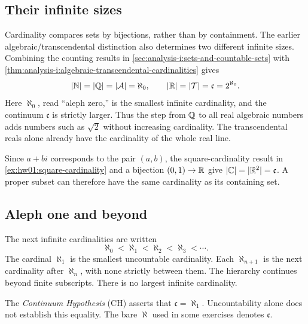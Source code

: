 \subsection{Their infinite sizes}
Cardinality compares sets by bijections, rather than by containment.
The earlier algebraic/transcendental distinction also determines two
different infinite sizes. Combining the counting results in
\autoref{sec:analysis-i:sets-and-countable-sets} with
\autoref{thm:analysis-i:algebraic-transcendental-cardinalities} gives
\[
  |\mathbb{N}|=|\mathbb{Q}|=|\mathcal A|=\aleph_0,
  \qquad
  |\mathbb{R}|=|\mathcal T|=\mathfrak c=2^{\aleph_0}.
\]
Here $\aleph_0$, read ``aleph zero,'' is the smallest infinite
cardinality, and the continuum $\mathfrak c$ is strictly larger.
Thus the step from $\mathbb{Q}$ to all real algebraic numbers adds numbers
such as $\sqrt2$ without increasing cardinality. The transcendental
reals alone already have the cardinality of the whole real line.

Since $a+bi$ corresponds to the pair $(a,b)$, the square-cardinality
result in \autoref{ex:hw01:square-cardinality} and a bijection
$(0,1)\to\mathbb{R}$ give $|\mathbb{C}|=|\mathbb{R}^2|=\mathfrak c$.
A proper subset can therefore have the same cardinality as its
containing set.

\subsection{Aleph one and beyond}
The next infinite cardinalities are written
\[
  \aleph_0<\aleph_1<\aleph_2<\aleph_3<\cdots.
\]
The cardinal $\aleph_1$ is the smallest uncountable cardinality.
Each $\aleph_{n+1}$ is the next cardinality after $\aleph_n$, with
none strictly between them. The hierarchy continues beyond finite
subscripts. There is no largest infinite cardinality.

The \emph{Continuum Hypothesis} (CH) asserts that
$\mathfrak c=\aleph_1$. Uncountability alone does not establish this
equality. The bare $\aleph$ used in some exercises denotes
$\mathfrak c$.
